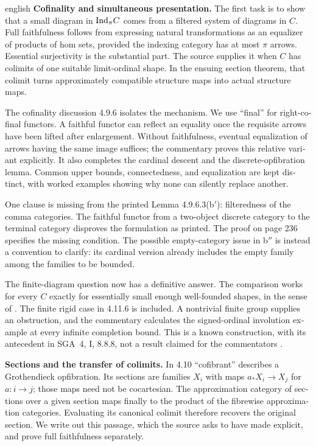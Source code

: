\begin{otherlanguage}{english}
\begin{otherlanguage*}{english}
\medskip\noindent\textbf{Cofinality and simultaneous presentation.}
The first task is to show that a small diagram in $\mathrm{Ind}_\pi C$ comes from a filtered system of diagrams in $C$. Full faithfulness follows from expressing natural transformations as an equalizer of products of hom sets, provided the indexing category has at most $\pi$ arrows. Essential surjectivity is the substantial part. The source supplies it when $C$ has colimits of one suitable limit-ordinal shape. In the ensuing section theorem, that colimit turns approximately compatible structure maps into actual structure maps.

The cofinality discussion 4.9.6 isolates the mechanism. We use ``final'' for right-cofinal functors. A faithful functor can reflect an equality once the requisite arrows have been lifted after enlargement. Without faithfulness, eventual equalization of arrows having the same image suffices; the commentary proves this relative variant explicitly. It also completes the cardinal descent and the discrete-opfibration lemma. Common upper bounds, connectedness, and equalization are kept distinct, with worked examples showing why none can silently replace another.

One clause is missing from the printed Lemma 4.9.6.3(b$'$): filteredness of the comma categories. The faithful functor from a two-object discrete category to the terminal category disproves the formulation as printed. The proof on page 236 specifies the missing condition. The possible empty-category issue in b$''$ is instead a convention to clarify: its cardinal version already includes the empty family among the families to be bounded.

The finite-diagram question now has a definitive answer. The comparison works for every $C$ exactly for essentially small enough well-founded shapes, in the sense of \citet[Theorem 1.3]{Henry2025Ind}. The finite rigid case in 4.11.6 is included. A nontrivial finite group supplies an obstruction, and the commentary calculates the signed-ordinal involution example at every infinite completion bound. This is a known construction, with its antecedent in SGA~4, I, 8.8.8, not a result claimed for the commentators \citep{SGA4I1972}.

\medskip\noindent\textbf{Sections and the transfer of colimits.}
In 4.10 ``cofibrant'' describes a Grothendieck opfibration. Its sections are families $X_i$ with maps $a_*X_i\to X_j$ for $a:i\to j$; those maps need not be cocartesian. The approximation category of sections over a given section maps finally to the product of the fibrewise approximation categories. Evaluating its canonical colimit therefore recovers the original section. We write out this passage, which the source asks to have made explicit, and prove full faithfulness separately.


\end{otherlanguage*}
\end{otherlanguage}
